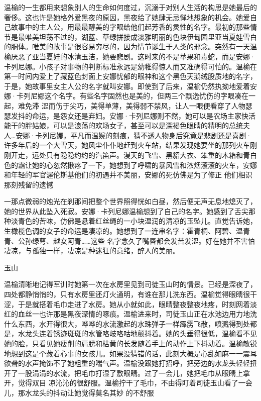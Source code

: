 \documentclass{article}
\begin{document}
温榆的一生都用来想象别人的生命如何度过，沉溺于对别人生活的构思是她最后的奢侈。这也许是她格外爱黑夜的原因，黑夜给了她肆无忌惮地想象的机会。她爱自己故事中的主人公，用最最醇美的字眼给他们起芳香的灵性的名字。最初的那些情节是最唯美坦荡不过的，湖蓝、草绿拼接成淡雅明丽的色块伊甸园里亚当夏娃雪白的胴体。唯美的故事是很容易穷尽的，因为情节诞生于人类的邪念。突然有一天温榆厌恶了亚当夏娃的冰清玉洁，她要悲剧。这时来的不是苹果和毒蛇，而是安娜·卡列尼娜。小孩子对事物的判断标准永远是幼稚得惊人而又准确得可怕的。温榆在第一时间内爱上了藏蓝色封面上安娜忧郁的眼神和这个黑色天鹅绒股质地的名字，于是，她故事里女主人公的名字就叫安娜。即使到了后来，温榆仍然执拗地爱着安娜·卡列尼娜这个名字。有些名字固然也是美的，但两三个飘逸忧伤的字眼凑在一起，难免滞
\newpage
涩而伤于尖巧，美得单薄，美得弱不禁风，让人一眼便看穿了人物瑟瑟发抖的命运，是怨女还是弃妇。安娜·卡列尼娜则不然，她可以是农场主家快活能干的胖姑娘，可以是浪荡的欢场女子，甚至可以是深褐色眼睛的精明的总统夫人…安娜·卡列尼娜，平凡而温婉的刻痕，猜不透人物身后究竟是悲剧还是喜剧·许多年后的一个大雪天，她风尘仆仆地赶到火车站，结果发现她要坐的那列火车刚刚开走，远处只有隐隐约约的汽笛声。漫天的飞雪、黑貂大衣、笨重的木箱和青白色的霜让她的心忽然揪疼了一下，她想到了呼啸的暴风雪和浓烟滚滚的火车，安娜和年轻的军官渥伦斯基他们的初遇并不美丽，安娜的死仿佛是为了修正
他们相识那刻残留的遗憾 

一那点微弱的烛光在刹那间把整个世界照得恍如白昼，然后便无声无息地熄灭了，她的世界从此坠入死寂。安娜·卡列尼娜温榆想到了自己的名字。她感到了舌尖那种淡青色的苦味，仿佛是悬着红丝绳的一小块温润的清凉的玉坠儿。直觉告诉她，生橄榄色调的女子的命运是凄凉的。她想到了一连串名字：霍青桐、阿碧、温青青、公孙绿萼、越女阿青……这些
\newpage
名字念久了嘴唇都会发苦发涩。好在她并不害怕凄凉，与孤独一样，凄凉是种迷狂的意绪，醉人的美丽。


玉山 

温榆清晰地记得军训时她第一次在水房里见到司徒玉山时的情景。已经是深夜了，四处都静悄悄的，只有水房里还灯火通明，有谁在那儿洗东西。温榆觉得眼睛很干涩，于是就搭着毛巾走进了水房。她从小就如此，眼晴整夜整夜地疼，时刻网着淡红的血丝一也许那是黑夜深情的啄痕。温榆进来时，司徒玉山正在水池边用力地洗什么东西，水开得很大，哗哗的水流激起的水珠弹子一样霹雳飞散，喷溅得到处都是，水龙头连着锈迹斑斑的水管咯岐咯咕地颤抖着。她的头垂得很低，温榆看不见她的脸，只看见她瘦削的肩膀和枯黄的长发随着手上的动作上下抖动着。温榆敏锐地想到这是个藏着心事的女孩儿。如果没猜错的话，此刻大概是心乱如麻一一震耳欲聋的水声掩饰不了她粗重的喘气声。温榆没跟她打招呼，把旁边的水龙头轻轻扭开了一股涓涓的水流，把毛巾打湿了敷眼睛。过了一会儿，她把毛巾从眼睛上拿开，觉得双目
\newpage
凉沁沁的很舒服。温榆拧干了毛巾，不由得盯着司徒玉山看了一会儿，那水龙头的抖动让她觉得莫名其妙
的不舒服 
\end{document}
